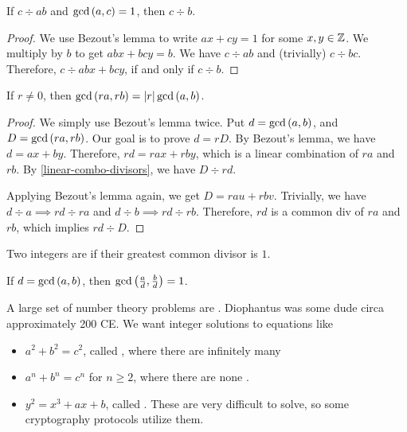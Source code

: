 \begin{lemma}
  \label{euclids-lemma}
  If $c \div ab$ and $\gcd\left( a,c \right) = 1$, then $c \div b$.
\end{lemma}
\begin{proof}
  We use Bezout's lemma to write $ax + cy = 1$ for some $x, y \in
  \mathbb{Z}$. We multiply by $b$ to get $abx + bcy = b$. We have $c \div
  ab$ and (trivially) $c \div bc$. Therefore, $c \div abx + bcy$, if
  and only if $c \div b$.
\end{proof}

\begin{lemma}
  If $r \ne 0$, then $\gcd\left( ra,rb \right) = \left| r \right|\gcd\left( a,b \right)$.
\end{lemma}
\begin{proof}
  We simply use Bezout's lemma twice. Put $d = \gcd\left( a,b \right)$, and $D =
  \gcd\left( ra,rb \right)$. Our goal is to prove $d = rD$. By Bezout's lemma, we
  have $d = ax + by$. Therefore, $rd = rax + rby$, which is a linear
  combination of $ra$ and $rb$. By \cref{linear-combo-divisors}, we
  have $D \div rd$.

  Applying Bezout's lemma again, we get $D = rau + rbv$. Trivially, we
  have $d \div a \implies rd \div ra$ and $d \div b \implies rd \div
  rb$. Therefore, $rd$ is a common div of $ra$ and $rb$, which implies
  $rd \div D$.
\end{proof}

\begin{definition}
  Two integers are  if their greatest common
  divisor is $1$.
\end{definition}

\begin{corollary}
  If $d = \gcd\left( a,b \right)$, then $\gcd\left( \frac{a}{d}, \frac{b}{d} \right) = 1$.
\end{corollary}

\begin{aside}
  A large set of number theory problems are . Diophantus was some dude circa approximately 200
  CE. We want integer solutions to equations like

  \begin{itemize}
  \item $a^2 + b^2 = c^2$, called , where
    there are infinitely many
  \item $a^n + b^n = c^n$ for $n \ge 2$, where there are
    none .
  \item $y^2 = x^3 + ax + b$, called . These are
    very difficult to solve, so some cryptography protocols utilize them.
  \end{itemize}
\end{aside}

